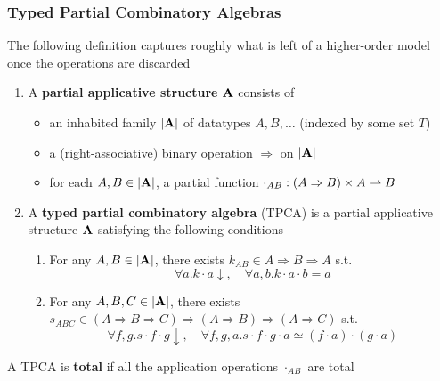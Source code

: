 \documentclass[11pt]{article}
\begin{document}
\subsubsection{Typed Partial Combinatory Algebras}
\label{sec:orgb94522d}
The following definition captures roughly what is left of a higher-order model once the
operations are discarded

\begin{definition}[]
\begin{enumerate}
\item A \textbf{partial applicative structure} \(\operatorname{\textbf{A}}\) consists of
\begin{itemize}
\item an inhabited family \(\abs{\bA}\) of datatypes \(A,B,\dots\) (indexed by some set \(T\))
\item a (right-associative) binary operation \(\Rightarrow\) on \(\abs{\bA}\)
\item for each \(A,B\in\abs{\bA}\), a partial function \(\cdot_{AB}:(A\Rightarrow B)\times A\rightharpoonup B\)
\end{itemize}
\item A \textbf{typed partial combinatory algebra} (TPCA) is a partial applicative structure \(\operatorname{\textbf{A}}\)
satisfying the following conditions
\begin{enumerate}
\item For any \(A,B\in\abs{\bA}\), there exists \(k_{AB}\in A\Rightarrow B\Rightarrow A\) s.t.
\begin{equation*}
\forall a.k\cdot a\downarrow,\quad\forall a,b.k\cdot a\cdot b=a
\end{equation*}
\item For any \(A,B,C\in\abs{\bA}\), there exists \(s_{ABC}\in(A\Rightarrow B\Rightarrow C)\Rightarrow(A\Rightarrow B)\Rightarrow(A\Rightarrow C)\) s.t.
\begin{equation*}
\forall f,g. s\cdot f\cdot g\downarrow,\quad\forall f,g,a.s\cdot f\cdot g\cdot a\simeq(f\cdot a)\cdot(g\cdot a)
\end{equation*}
\end{enumerate}
\end{enumerate}


A TPCA is \textbf{total} if all the application operations \(\cdot_{AB}\) are total
\end{definition}
\end{document}
